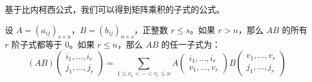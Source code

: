 
基于比内柯西公式，我们可以得到矩阵乘积的子式的公式。

\begin{theorem}
	设 $A = (a_{ij})_{s \times n}$，$B = (b_{ij})_{n \times s}$，正整数 $r \le s$。如果 $r > n$，那么 $AB$ 的所有 $r$ 阶子式都等于 $0$。如果 $r \le n$，那么 $AB$ 的任一子式为：
	$$
	(AB) \begin{pmatrix} i_1, \ldots, i_r \\ j_1, \ldots, j_r \end{pmatrix} = \sum\limits_{1 \le v_1 < \cdots < v_r \le n} A \begin{pmatrix} i_1, \ldots, i_r \\ v_1, \ldots, v_r \end{pmatrix} B \begin{pmatrix} v_1, \ldots, v_r \\ j_1, \ldots, j_r \end{pmatrix}
	$$
\end{theorem}

